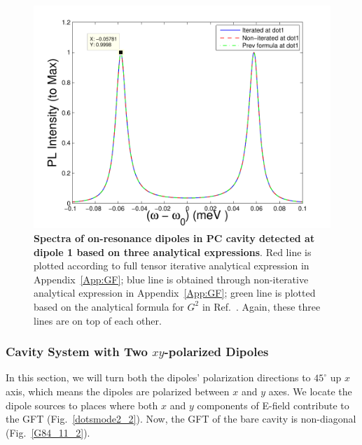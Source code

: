 \begin{figure}[H]
\centering
\begin{center}
\includegraphics[width=14cm]{./Figs/sp84_11_4}
\end{center}
\caption[Spectra of on-resonance dipoles, based on three analytical expressions.]{\textbf{Spectra of on-resonance dipoles in PC cavity detected at dipole 1 based on three analytical expressions}. Red line is plotted according to full tensor iterative analytical expression in Appendix~\ref{App:GF}; blue line is obtained through non-iterative analytical expression in Appendix~\ref{App:GF}; green line is plotted based on the analytical formula for $G^2$ in Ref.~\cite{Yao2009c}. Again, these three lines are on top of each other.}
\label{sp84_11_4}
\end{figure}


\subsubsection{Cavity System with Two $xy$-polarized Dipoles}
In this section, we will turn both the dipoles' polarization directions to $45^\circ$ up $x$ axis,
which means the dipoles are polarized between $x$ and $y$ axes.
We locate the dipole sources to places where both $x$ and $y$ components of E-field contribute to the GFT (Fig.~\ref{dotsmode2_2}). Now, the GFT of the bare cavity is non-diagonal (Fig.~\ref{G84_11_2}).


